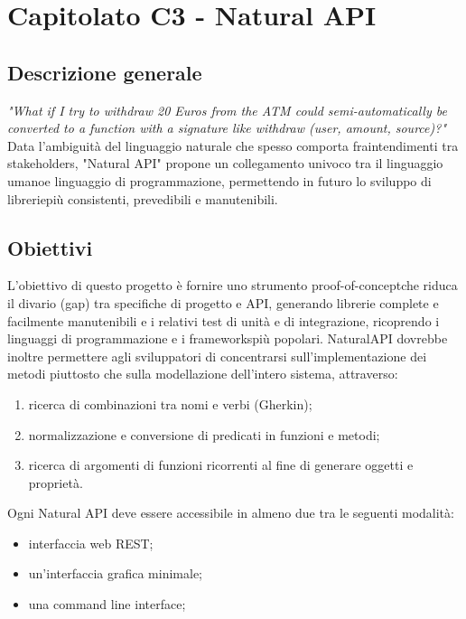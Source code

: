 \section{Capitolato C3 - Natural API}

\subsection{Descrizione generale}
\textit{"What if I try to withdraw 20 Euros from the ATM could semi-automatically be converted to a function with a signature like withdraw (user, amount, source)?"} \\
Data l’ambiguità del linguaggio naturale che spesso comporta fraintendimenti tra stakeholders\glo, "Natural API" propone un collegamento univoco tra il linguaggio umano\glo e linguaggio di programmazione\glo, permettendo in futuro lo sviluppo di librerie\glo più consistenti, prevedibili e manutenibili\glo.


\subsection{Obiettivi}
L’obiettivo di questo progetto è fornire uno strumento proof-of-concept\glo che riduca il divario (gap) tra specifiche di progetto e API, generando librerie complete e facilmente manutenibili e i relativi test di unità e di integrazione, ricoprendo i linguaggi di programmazione e i frameworks\glo più popolari.
NaturalAPI dovrebbe inoltre permettere agli sviluppatori di concentrarsi sull’implementazione dei metodi piuttosto che sulla modellazione dell’intero sistema, attraverso: \begin{enumerate}
\item ricerca di combinazioni tra nomi e verbi (Gherkin);
\item normalizzazione e conversione di predicati in funzioni e metodi;
\item ricerca di argomenti di funzioni ricorrenti al fine di generare oggetti e proprietà.
\end{enumerate}
Ogni Natural API deve essere accessibile in almeno due tra le seguenti modalità: \begin{itemize}
\item interfaccia web REST\glo;
\item un’interfaccia grafica minimale;
\item una command line interface\glo;
\end{itemize}

